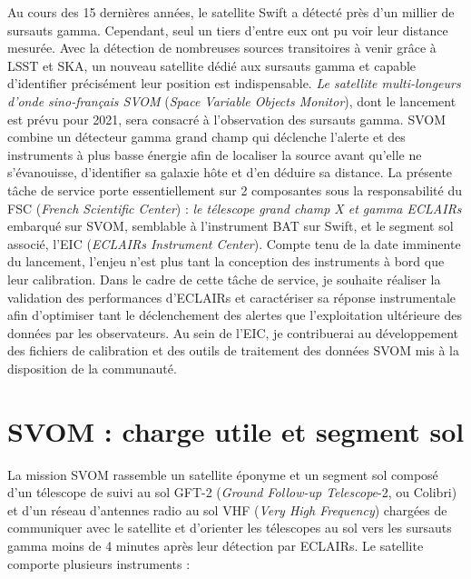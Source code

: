 \documentclass[12pt,onecolumn]{article}
\begin{document}
Au cours des 15 dernières années, le satellite Swift a détecté près d'un millier de sursauts gamma. Cependant, seul un tiers d'entre eux ont pu voir leur distance mesurée. Avec la détection de nombreuses sources transitoires à venir grâce à LSST et SKA, un nouveau satellite dédié aux sursauts gamma et capable d'identifier précisément leur position est indispensable. \textit{Le satellite multi-longeurs d'onde sino-français SVOM} (\textit{Space Variable Objects Monitor}), dont le lancement est prévu pour 2021, sera consacré à l'observation des sursauts gamma. SVOM combine un détecteur gamma grand champ qui déclenche l'alerte et des instruments à plus basse énergie afin de localiser la source avant qu'elle ne s'évanouisse, d'identifier sa galaxie hôte et d'en déduire sa distance. La présente tâche de service porte essentiellement sur 2 composantes sous la responsabilité du FSC (\textit{French Scientific Center}) : \textit{le télescope grand champ X et gamma ECLAIRs} embarqué sur SVOM, semblable à l'instrument BAT sur Swift, et le segment sol associé, l'EIC (\textit{ECLAIRs Instrument Center}). Compte tenu de la date imminente du lancement, l'enjeu n'est plus tant la conception des instruments à bord que leur calibration. Dans le cadre de cette tâche de service, je souhaite réaliser la validation des performances d'ECLAIRs et caractériser sa réponse instrumentale afin d'optimiser tant le déclenchement des alertes que l'exploitation ultérieure des données par les observateurs. Au sein de l'EIC, je contribuerai au développement des fichiers de calibration et des outils de traitement des données SVOM mis à la disposition de la communauté.

\section{SVOM : charge utile et segment sol}

La mission SVOM rassemble un satellite éponyme et un segment sol composé d'un télescope de suivi au sol GFT-2 (\textit{Ground Follow-up Telescope}-2, ou Colibri) et d'un réseau d'antennes radio au sol VHF (\textit{Very High Frequency}) chargées de communiquer avec le satellite et d'orienter les télescopes au sol vers les sursauts gamma moins de 4 minutes après leur détection par ECLAIRs. Le satellite comporte plusieurs instruments :
\end{document}
